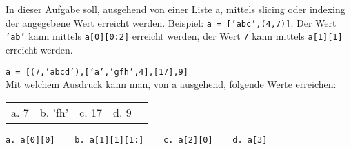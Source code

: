 \question[4]
In dieser Aufgabe soll, ausgehend von einer Liste a, mittels slicing
oder indexing der angegebene Wert erreicht werden.
Beispiel: \texttt{a = ['abc',(4,7)]}.
 Der Wert \texttt{'ab'} kann mittels \texttt{a[0][0:2]} erreicht werden, der Wert 
\texttt{7} kann mittels \texttt{a[1][1]} erreicht werden.

\texttt{a = [(7,'abcd'),['a','gfh',4],[17],9]} \\
Mit welchem Ausdruck kann man, von a ausgehend, folgende Werte erreichen:  \\
\begin{tabular}{lllll}
a. 7 & b. 'fh' & c. 17 & d. 9 \\
\end{tabular}
\begin{solutionbox}{1cm}
\texttt{a. a[0][0] ~~  b. a[1][1][1:] ~~ c. a[2][0] ~~ d. a[3]}
\end{solutionbox}
